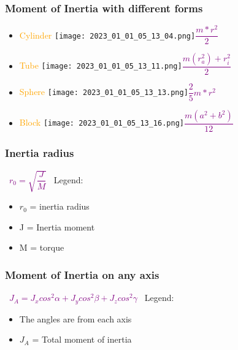 \documentclass[main.tex,fontsize=8pt,paper=a4,paper=portrait,DIV=calc,]{scrartcl}
\begin{document}
\begin{multicols*}{2}
\subsubsection{Moment of Inertia with different forms}
\begin{itemize}
  \item \textcolor{orange}{Cylinder} \newline
    \texttt{[image: 2023\_01\_01\_05\_13\_04.png]}\textcolor{purple}{\( \dfrac{m * r^2}{2} \)}
  \item \textcolor{orange}{Tube} \newline
    \texttt{[image: 2023\_01\_01\_05\_13\_11.png]}\textcolor{purple}{\( \dfrac{m(r^2_a) + r^2_i}{2} \)}
  \item \textcolor{orange}{Sphere} \newline
    \texttt{[image: 2023\_01\_01\_05\_13\_13.png]}\textcolor{purple}{\( \dfrac{2}{5} m * r^2 \)}
  \item \textcolor{orange}{Block} \newline
    \texttt{[image: 2023\_01\_01\_05\_13\_16.png]}\textcolor{purple}{\( \dfrac{m(a^2 + b^2)}{12} \)}
\end{itemize} 

\subsubsection{Inertia radius}
\, \newline
\large \textcolor{purple}{\( r_0 = \sqrt{\dfrac{J}{M}} \)}\newline
\, \newline
\normalsize Legend: \newline
\begin{itemize}
\item \(r_0\) = inertia radius
\item J = Inertia moment
\item M = torque 
\end{itemize} 

\subsubsection{Moment of Inertia on any axis}
\, \newline
\large \textcolor{purple}{\( J_A = J_x cos^2 \alpha + J_y cos^2 \beta + J_z cos^2 \gamma \)}\newline
\, \newline
\normalsize Legend: \newline
\begin{itemize}
\item The angles are from each axis
\item \(J_A\) = Total moment of inertia
\end{itemize} 


\end{multicols*}
\end{document}
